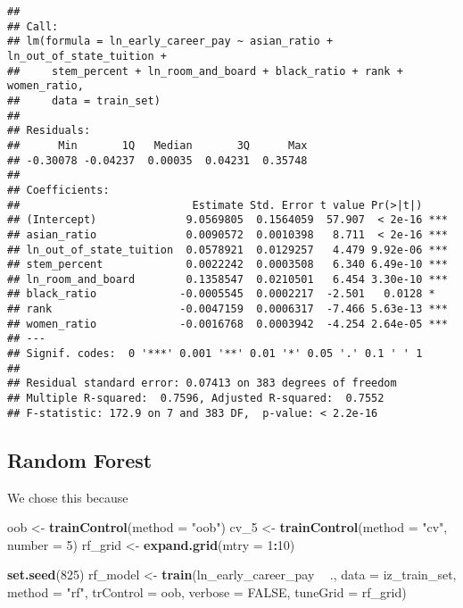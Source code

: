 \documentclass[
]{article}
\newenvironment{Shaded}{\begin{snugshade}}{\end{snugshade}}
\newcommand{\DataTypeTok}[1]{\textcolor[rgb]{0.13,0.29,0.53}{#1}}
\newcommand{\DecValTok}[1]{\textcolor[rgb]{0.00,0.00,0.81}{#1}}
\newcommand{\KeywordTok}[1]{\textcolor[rgb]{0.13,0.29,0.53}{\textbf{#1}}}
\newcommand{\NormalTok}[1]{#1}
\newcommand{\OperatorTok}[1]{\textcolor[rgb]{0.81,0.36,0.00}{\textbf{#1}}}
\newcommand{\OtherTok}[1]{\textcolor[rgb]{0.56,0.35,0.01}{#1}}
\newcommand{\StringTok}[1]{\textcolor[rgb]{0.31,0.60,0.02}{#1}}
\begin{document}
\begin{verbatim}
## 
## Call:
## lm(formula = ln_early_career_pay ~ asian_ratio + ln_out_of_state_tuition + 
##     stem_percent + ln_room_and_board + black_ratio + rank + women_ratio, 
##     data = train_set)
## 
## Residuals:
##      Min       1Q   Median       3Q      Max 
## -0.30078 -0.04237  0.00035  0.04231  0.35748 
## 
## Coefficients:
##                           Estimate Std. Error t value Pr(>|t|)    
## (Intercept)              9.0569805  0.1564059  57.907  < 2e-16 ***
## asian_ratio              0.0090572  0.0010398   8.711  < 2e-16 ***
## ln_out_of_state_tuition  0.0578921  0.0129257   4.479 9.92e-06 ***
## stem_percent             0.0022242  0.0003508   6.340 6.49e-10 ***
## ln_room_and_board        0.1358547  0.0210501   6.454 3.30e-10 ***
## black_ratio             -0.0005545  0.0002217  -2.501   0.0128 *  
## rank                    -0.0047159  0.0006317  -7.466 5.63e-13 ***
## women_ratio             -0.0016768  0.0003942  -4.254 2.64e-05 ***
## ---
## Signif. codes:  0 '***' 0.001 '**' 0.01 '*' 0.05 '.' 0.1 ' ' 1
## 
## Residual standard error: 0.07413 on 383 degrees of freedom
## Multiple R-squared:  0.7596, Adjusted R-squared:  0.7552 
## F-statistic: 172.9 on 7 and 383 DF,  p-value: < 2.2e-16
\end{verbatim}

\hypertarget{random-forest}{%
\subsection{Random Forest}\label{random-forest}}

We chose this because

\begin{Shaded}
\begin{Highlighting}[]
\NormalTok{oob <-}\StringTok{ }\KeywordTok{trainControl}\NormalTok{(}\DataTypeTok{method =} \StringTok{"oob"}\NormalTok{)}
\NormalTok{cv_}\DecValTok{5}\NormalTok{ <-}\StringTok{ }\KeywordTok{trainControl}\NormalTok{(}\DataTypeTok{method =} \StringTok{"cv"}\NormalTok{, }\DataTypeTok{number =} \DecValTok{5}\NormalTok{)}
\NormalTok{rf_grid <-}\StringTok{ }\KeywordTok{expand.grid}\NormalTok{(}\DataTypeTok{mtry =} \DecValTok{1}\OperatorTok{:}\DecValTok{10}\NormalTok{)}

\KeywordTok{set.seed}\NormalTok{(}\DecValTok{825}\NormalTok{)}
\NormalTok{rf_model <-}\StringTok{ }\KeywordTok{train}\NormalTok{(ln_early_career_pay }\OperatorTok{~}\StringTok{ }\NormalTok{., }\DataTypeTok{data =}\NormalTok{ iz_train_set,}
                     \DataTypeTok{method =} \StringTok{"rf"}\NormalTok{,}
                     \DataTypeTok{trControl =}\NormalTok{ oob,}
                     \DataTypeTok{verbose =} \OtherTok{FALSE}\NormalTok{,}
                     \DataTypeTok{tuneGrid =}\NormalTok{ rf_grid)}
\end{Highlighting}
\end{Shaded}
\end{document}

